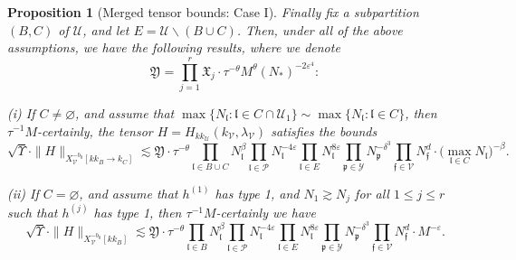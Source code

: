 \documentclass[11 pt,reqno]{amsart}
\newtheorem{prop}[thm]{Proposition}
\theoremstyle{definition}
\theoremstyle{remark}
\numberwithin{equation}{section}
\newcommand{\Pc}{\mathcal{P}}
\newcommand{\Uc}{\mathcal{U}}
\newcommand{\Vc}{\mathcal{V}}
\newcommand{\Yc}{\mathcal{Y}}
\newcommand{\pf}{\mathfrak{p}}
\newcommand{\ff}{\mathfrak{f}}
\newcommand{\Xf}{\mathfrak{X}}
\newcommand{\lf}{\mathfrak{l}}
\newcommand{\Yf}{\mathfrak{Y}}
\begin{document}
{\begin{prop}[Merged tensor bounds: Case I]
 Finally fix a subpartition $(B,C)$ of $\Uc$, and let $E=\Uc\backslash(B\cup C)$.
Then, under all of the above assumptions, we have the following results, where we denote
 \begin{equation}\label{boundmerge10}\Yf=\prod_{j=1}^r\Xf_j\cdot\tau^{-\theta}M^{\theta}(N_*)^{-2\varepsilon^4}:
 \end{equation}

(i) If $C\neq\varnothing$, and assume that $\max\{N_\lf:\lf\in C\cap\Uc_1\}\sim\max\{N_\lf:\lf\in C\}$, then $\tau^{-1}M$-certainly, the tensor $H=H_{kk_\Uc}(k_\Vc,\lambda_\Vc)$ satisfies the bounds \begin{equation}\label{boundmerge7}\sqrt{\Upsilon}\cdot\|H\|_{X_{\Vc}^{-b_0}[kk_{B}\to k_{C}]}\lesssim\Yf\cdot\tau^{-\theta}\prod_{\lf\in B\cup C}N_\lf^\beta\prod_{\lf\in\Pc}N_\lf^{-4\varepsilon}\prod_{\lf\in E}N_\lf^{8\varepsilon}\prod_{\pf\in\Yc}N_\pf^{-\delta^3} \prod_{\ff \in \Vc} N_\ff^d\cdot \big(\max_{\lf\in C}N_\lf\big)^{-\beta}.
 \end{equation}

(ii) If $C=\varnothing$, and assume that $h^{(1)}$ has type 1, and $N_1\gtrsim N_j$ for all $1\leq j\leq r$ such that $h^{(j)}$ has type 1, then $\tau^{-1}M$-certainly we have  \begin{equation}  \label{boundmerge8}\sqrt{\Upsilon}\cdot\|H\|_{X_{\Vc}^{-b_0}[kk_{B}]}\lesssim\Yf\cdot\tau^{-\theta}\prod_{\lf\in B}N_\lf^\beta\prod_{\lf\in\Pc}N_\lf^{-4\varepsilon}\prod_{\lf\in E}N_\lf^{8\varepsilon}\prod_{\pf\in\Yc}N_\pf^{-\delta^3}\prod_{\ff \in \Vc} N_\ff^d\cdot M^{-\varepsilon}.
 \end{equation}
 

\end{prop}}
\end{document}
